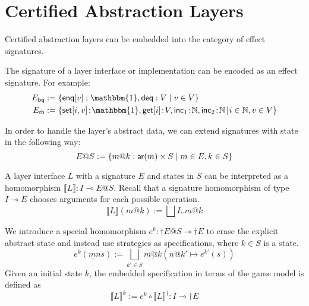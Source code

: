 \documentclass[acmsmall,review,anonymous]{acmart}\settopmatter{printfolios=true,printccs=false,printacmref=false}
\begin{document}
\section{Certified Abstraction Layers}

Certified abstraction layers can be embedded into the category of effect
signatures.

The signature of a layer interface or implementation
can be encoded as an effect signature.
For example:
\begin{align*}
  E_\kw{bq} &:= \{
    \kw{enq}[v] : \mathbbm{1}, \kw{deq} : V \mid
    v \in V \} \\
  E_\kw{rb} &:= \{
    \kw{set}[i, v] \! : \! \mathbbm{1},
    \kw{get}[i] \! : \! V,
    \kw{inc}_1 \! : \! \mathbb{N},
    \kw{inc}_2 \! : \! \mathbb{N} \! \mid \!
    i \in \mathbb{N}, v \in V \}
\end{align*}

In order to handle the layer's abstract data,
we can extend signatures with state in the following way:
\[
  E@S :=
    \{ m@k :  \mathsf{ar} (m) \times S \mid
       m \in E, k \in S \}
\]

A layer interface $L$ with a signature $E$
and states in $S$
can be interpreted as
a homomorphism $\llbracket L \rrbracket : I \multimap E@S$.
Recall that a signature homomorphism of type $I \multimap E$
chooses arguments for each possible operation.
\[
  \llbracket L \rrbracket (m@k) :=
    \bigsqcup L.m@k
\]

We introduce a special homomorphism $e^k : \dagger E@S \multimap \dagger E$
to erase the explicit abstract state and instead use
strategies as specifications, where $k \in S$
is a state.
\[
  e^k(\underline{m}ns) \mathrel{:=} \bigsqcup_{k'\in S} \underline{m@k}(n@k' \mapsto e^{k'}(s))
\]
Given an initial state $k$, the embedded specification
in terms of the game model is defined as
\[
  \llbracket L \rrbracket^k \mathrel{:=} e^k \circ \llbracket L \rrbracket^\dagger : I \multimap \dagger E
\]
\end{document}
